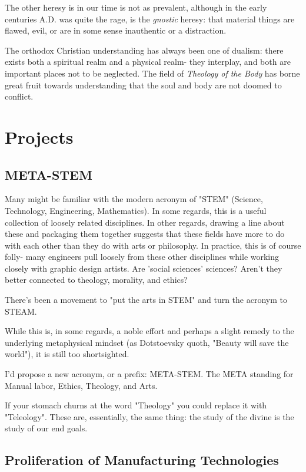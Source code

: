\documentclass[letterpaper]{article}
\begin{document}
The other heresy is in our time is not as prevalent, although in the early centuries A.D. was quite the rage, is the \textit{gnostic} heresy: that material things are flawed, evil, or are in some sense inauthentic or a distraction.

The orthodox Christian understanding has always been one of dualism: there exists both a spiritual realm and a physical realm- they interplay, and both are important places not to be neglected. The field of \textit{Theology of the Body} has borne great fruit towards understanding that the soul and body are not doomed to conflict.

\section{Projects}

\subsection{META-STEM}

Many might be familiar with the modern acronym of "STEM" (Science, Technology, Engineering, Mathematics). In some regards, this is a useful collection of loosely related disciplines. In other regards, drawing a line about these and packaging them together suggests that these fields have more to do with each other than they do with arts or philosophy. In practice, this is of course folly- many engineers pull loosely from these other disciplines while working closely with graphic design artists. Are 'social sciences' sciences? Aren't they better connected to theology, morality, and ethics?

There's been a movement to "put the arts in STEM" and turn the acronym to STEAM.

While this is, in some regards, a noble effort and perhaps a slight remedy to the underlying metaphysical mindset (as Dotstoevsky quoth, "Beauty will save the world"), it is still too shortsighted.

I'd propose a new acronym, or a prefix: META-STEM. The META standing for Manual labor, Ethics, Theology, and Arts.

If your stomach churns at the word "Theology" you could replace it with "Teleology". These are, essentially, the same thing: the study of the divine is the study of our end goals.

\subsection{Proliferation of Manufacturing Technologies}
\end{document}
